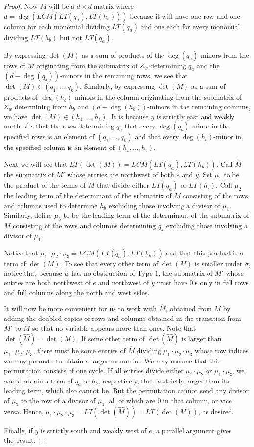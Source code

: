 \begin{proof}
Now $M$ will be a $d \times d$ matrix where $d = \deg(LCM(LT(q_a),LT(h_b)))$ because it will have one row and one column for each monomial dividing $LT(q_a)$ and one each for every monomial dividing $LT(h_b)$ but not $LT(q_a)$.  

By expressing $\det(M)$ as a sum of products of the $\deg(q_a)$-minors from the rows of $M$ originating from the submatrix of $Z_w$ determining $q_a$ and the $(d-\deg(q_a))$-minors in the remaining rows, we see that $\det(M) \in (q_1, \ldots, q_k)$.  Similarly, by expressing $\det(M)$ as a sum of products of $\deg(h_b)$-minors in the column originating from the submatrix of $Z_w$ determining from $h_b$ and $(d-\deg(h_b))$-minors in the remaining columns, we have $\det(M) \in (h_1, \ldots, h_\ell)$.  It is because $y$ is strictly east and weakly north of $e$ that the rows determining $q_a$ that every $\deg(q_a)$-minor in the specified rows is an element of $(q_1, \ldots, q_k)$ and that every $\deg(h_b)$-minor in the specified column is an element of $(h_1, \ldots, h_\ell)$.

Next we will see that $LT(\det(M)) = LCM(LT(q_a),LT(h_b))$.  Call $\tilde{M}$ the submatrix of $M'$ whose entries are northwest of both $e$ and $y$.  Set $\mu_1$ to be the product of the terms of $\tilde{M}$ that divide either $LT(q_a)$ or $LT(h_b)$.  Call $\mu_2$ the leading term of the determinant of the submatrix of $M$ consisting of the rows and columns used to determine $h_b$ excluding those involving a divisor of $\mu_1$.  Similarly, define $\mu_3$ to be the leading term of the determinant of the submatrix of $M$ consisting of the rows and columns determining $q_a$ excluding those involving a divisor of $\mu_1$.  

Notice that $\mu_1 \cdot \mu_2 \cdot \mu_3 = LCM(LT(q_a),LT(h_b))$ and that this product is a term of $\det(M)$.  To see that every other term of $\det(M)$ is smaller under $\sigma$, notice that because $w$ has no obstruction of Type $1$, the submatrix of $M'$ whose entries are both northwest of $e$ and northwest of $y$ must have $0$'s only in full rows and full columns along the north and west sides.  

It will now be more convenient for us to work with $\widehat{M}$, obtained from $M$ by adding the doubled copies of rows and columns obtained in the transition from $M'$ to $M$ so that no variable appears more than once.  Note that $\det(\widehat{M}) = \det(M)$.  If some other term of $\det(\widehat{M})$ is larger than $\mu_1 \cdot \mu_2 \cdot \mu_3$, there must be some entries of $\widehat{M}$ dividing $\mu_1 \cdot \mu_2 \cdot \mu_3$ whose row indices we may permute to obtain a larger monomial.  We may assume that this permutation consists of one cycle.  If all entries divide either $\mu_1 \cdot \mu_2$ or $\mu_1\cdot \mu_3$, we would obtain a term of $q_a$ or $h_b$, respectively, that is strictly larger than its leading term, which also cannot be.  But the permutation cannot send any divisor of $\mu_3$ to the row of a divisor of $\mu_1$, all of which are $0$ in that column, or vice versa.  Hence, $\mu_1 \cdot \mu_2 \cdot \mu_3 = LT(\det(\widehat{M})) = LT(\det(M))$, as desired.

Finally, if $y$ is strictly south and weakly west of $e$, a parallel argument gives the~result.
\end{proof}
